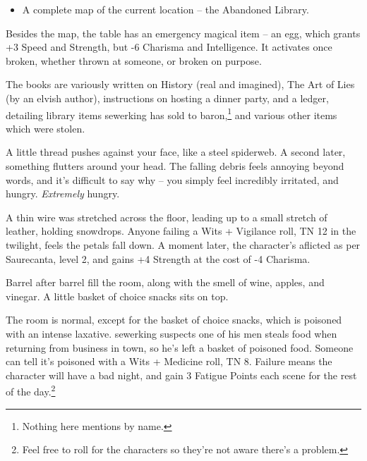 \begin{multicols}{2}
\begin{itemize}
	\item{A complete map of the current location -- the Abandoned Library.}

\end{itemize}

Besides the map, the table has an emergency magical item -- an egg, which grants +3 Speed and Strength, but -6 Charisma and Intelligence.
It activates once broken, whether thrown at someone, or broken on purpose.

The books are variously written on History (real and imagined), The Art of Lies (by an elvish author), instructions on hosting a dinner party, and a ledger, detailing library items \gls{sewerking} has sold to \gls{baron},\footnote{Nothing here mentions  by name.} and various other items which were stolen.


\begin{boxtext}

	A little thread pushes against your face, like a steel spiderweb.
	A second later, something flutters around your head.
	The falling debris feels annoying beyond words, and it's difficult to say why -- you simply feel incredibly irritated, and hungry.
	\emph{Extremely} hungry.

\end{boxtext}

A thin wire was stretched across the floor, leading up to a small stretch of leather, holding snowdrops.  Anyone failing a Wits + Vigilance roll, TN 12 in the twilight, feels the petals fall down.  A moment later, the character's aflicted as per Saurecanta, level 2, and gains +4 Strength at the cost of -4 Charisma.


\begin{boxtext}

	Barrel after barrel fill the room, along with the smell of wine, apples, and vinegar.  A little basket of choice snacks sits on top.

\end{boxtext}

The room is normal, except for the basket of choice snacks, which is poisoned with an intense laxative.  \Gls{sewerking} suspects one of his men steals food when returning from business in town, so he's left a basket of poisoned food.  Someone can tell it's poisoned with a Wits + Medicine roll, TN 8.  Failure means the character will have a bad night, and gain 3 Fatigue Points each scene for the rest of the day.\footnote{Feel free to roll for the characters so they're not aware there's a problem.}


\end{multicols}

